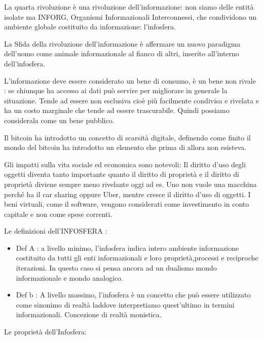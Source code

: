 \documentclass[a4page, 11pt]{article}
\begin{document}
La quarta rivoluzione è una rivoluzione dell'informazione: non siamo
delle entità isolate ma INFORG, Organismi Informazionali Interconnessi,
che condividono un ambiente globale costituito da informazione:
l'infosfera.

La Sfida della rivoluzione dell'informazione è affermare un nuovo
paradigma dell'uomo come animale informazionale al fianco di altri,
inserito all'interno dell'infosfera.

L'informazione deve essere considerato un bene di consumo, è un bene non
rivale : se chiunque ha accesso ai dati può servire per migliorare in
generale la situazione. Tende ad essere non esclusiva cioè più
facilmente condivisa e rivelata e ha un costo marginale che tende ad
essere trascurabile. Quindi possiamo considerala come un bene pubblico.

Il bitcoin ha introdotto un concetto di scarsità digitale, definendo
come finito il mondo del bitcoin ha introdotto un elemento che prima di
allora non esisteva.

Gli impatti sulla vita sociale ed economica sono notevoli: Il diritto
d'uso degli oggetti diventa tanto importante quanto il diritto di
proprietà e il diritto di proprietà diviene sempre meno rivelante oggi
ad es. Uno non vuole una macchina perché ha il car sharing oppure Uber,
mentre cresce il diritto d'uso di oggetti. I beni virtuali, come il
software, vengono considerati come investimento in conto capitale e non
come spese correnti.

Le definizioni dell'INFOSFERA :

\begin{itemize}
	 
	\item
	Def A : a livello minimo, l'infosfera indica intero ambiente
	informazione costituito da tutti gli enti informazionali e loro
	proprietà,processi e reciproche iterazioni.
	In questo caso si pensa ancora ad un dualismo mondo informazionale
	e mondo analogico.
	\item
	Def b : A livello massimo, l'infosfera è un concetto che può essere
	utilizzato come sinonimo di realtà laddove interpretiamo quest'ultimo
	in termini informazionali. Concezione di realtà monistica.
\end{itemize}

Le proprietà dell'Infosfera:
\end{document}
